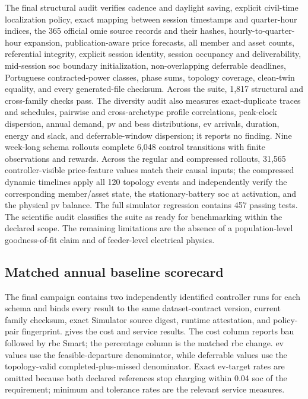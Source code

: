 The final structural audit verifies cadence and daylight saving, explicit civil-time localization policy, exact mapping between session timestamps and quarter-hour indices, the 365 official \gls{omie} source records and their hashes, hourly-to-quarter-hour expansion, publication-aware price forecasts, all member and asset counts, referential integrity, explicit session identity, session occupancy and deliverability, mid-session \gls{soc} boundary initialization, non-overlapping deferrable deadlines, Portuguese contracted-power classes, phase sums, topology coverage, clean-twin equality, and every generated-file checksum. Across the suite, 1,817 structural and cross-family checks pass. The diversity audit also measures exact-duplicate traces and schedules, pairwise and cross-archetype profile correlations, peak-clock dispersion, annual demand, \gls{pv} and \gls{bess} distributions, \gls{ev} arrivals, duration, energy and slack, and deferrable-window dispersion; it reports no finding. Nine week-long schema rollouts complete 6,048 control transitions with finite observations and rewards. Across the regular and compressed rollouts, 31,565 controller-visible price-feature values match their causal inputs; the compressed dynamic timelines apply all 120 topology events and independently verify the corresponding member/asset state, the stationary-battery \gls{soc} at activation, and the physical \gls{pv} balance. The full simulator regression contains 457 passing tests. The scientific audit classifies the suite as ready for benchmarking within the declared scope. The remaining limitations are the absence of a population-level goodness-of-fit claim and of feeder-level electrical physics.

\subsection{Matched annual baseline scorecard}

The final campaign contains two independently identified controller runs for each schema and binds every result to the same dataset-contract version, current family checksum, exact Simulator source digest, runtime attestation, and policy-pair fingerprint.  gives the cost and service results. The cost column reports \gls{bau} followed by \gls{rbc} Smart; the percentage column is the matched \gls{rbc} change. \gls{ev} values use the feasible-departure denominator, while deferrable values use the topology-valid completed-plus-missed denominator. Exact \gls{ev}-target rates are omitted because both declared references stop charging within 0.04 \gls{soc} of the requirement; minimum and tolerance rates are the relevant service measures.

